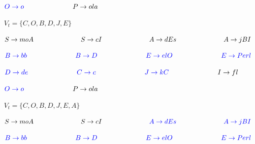 $ \textcolor{blue}{ O \rightarrow o } \hspace{2.5cm} P \rightarrow ola$ \newline \newline

$ V_{t} = \{ C,O,B,D,J,E \} $ \newline

$ S \rightarrow moA \hspace{2.5cm} S \rightarrow cI \hspace{2.5cm} A \rightarrow  dEs \hspace{2.5cm} A \rightarrow  jBI $ \newline

$ \textcolor{blue}{ B \rightarrow bb } \hspace{2.5cm} \textcolor{blue}{ B \rightarrow D } \hspace{2.5cm} \textcolor{blue}{ E \rightarrow  elO } \hspace{2.5cm} \textcolor{blue}{ E \rightarrow  Perl} $ \newline

$ \textcolor{blue}{ D \rightarrow de } \hspace{2.5cm} \textcolor{blue}{ C \rightarrow c} \hspace{2.5cm} \textcolor{blue}{ J \rightarrow  kC } \hspace{2.5cm} I \rightarrow  fl$ \newline

$ \textcolor{blue}{ O \rightarrow o } \hspace{2.5cm} P \rightarrow ola$ \newline \newline

$ V_{t} = \{ C,O,B,D,J,E,A \} $ \newline

$ S \rightarrow moA \hspace{2.5cm} S \rightarrow cI \hspace{2.5cm} \textcolor{blue}{ A \rightarrow  dEs } \hspace{2.5cm} \textcolor{blue}{ A \rightarrow  jBI }$ \newline

$ \textcolor{blue}{ B \rightarrow bb } \hspace{2.5cm} \textcolor{blue}{ B \rightarrow D } \hspace{2.5cm} \textcolor{blue}{ E \rightarrow  elO } \hspace{2.5cm} \textcolor{blue}{ E \rightarrow  Perl} $ \newline

